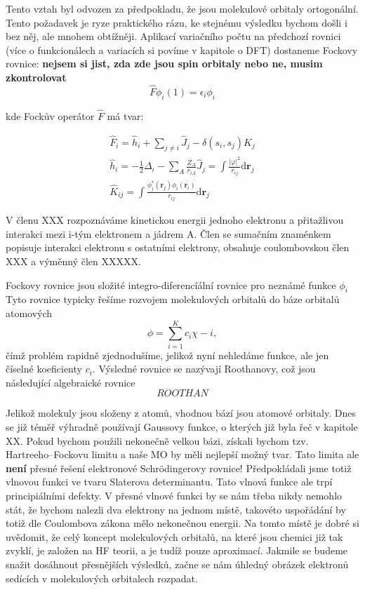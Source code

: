 Tento vztah byl odvozen za předpokladu, že jsou molekulové orbitaly ortogonální. Tento požadavek je ryze praktického rázu, ke stejnému výsledku bychom došli i bez něj, ale mnohem obtížněji. Aplikací variačního počtu na předchozí rovnici (více o funkcionálech a variacích si povíme v kapitole o DFT) dostaneme Fockovy rovnice: \textbf{nejsem si jist, zda zde jsou spin orbitaly nebo ne, musim zkontrolovat}
\begin{equation}
\hat{F}\phi_i(1) = \epsilon_i \phi_i   
\end{equation}

kde Fockův operátor $\hat{F}$ má tvar:

\begin{eqnarray}
\hat{F}_i = \hat{h}_i+\sum_{j\neq i} \hat{J}_j - \delta(s_i,s_j) \hat{K}_j \\
\hat{h}_i = -\frac{1}{2}\Delta_i - \sum_{A}\frac{Z_A}{r_{iA}}
\hat{J}_j=\int \frac{|\varphi |^2}{r_{ij}}\mathrm{d}\textbf{r}_j \\
\hat{K}_{ij} = \int \frac{\phi_j^*(\mathbf{r}_j)\phi_i(\mathbf{r}_i)}{r_{ij}}\mathrm{d}\textbf{r}_j
\end{eqnarray}

V členu XXX rozpoznáváme kinetickou energii jednoho elektronu a přitažlivou interakci mezi i-tým elektronem a jádrem A. Člen se sumačním znaménkem popisuje interakci elektronu s ostatními elektrony, obsahuje coulombovskou člen XXX a výměnný člen XXXXX.


Fockovy rovnice jsou složité integro-diferencíální rovnice pro neznámé funkce $\phi_i$
Tyto rovnice typicky řešíme rozvojem molekulových orbitalů do báze orbitalů atomových
\begin{equation}
\phi=\sum_{i=1}^K c_i \chi-i ,
\end{equation}
čímž problém rapidně zjednodušíme, jelikož nyní nehledáme funkce, ale jen číselné koeficienty $c_i$.
Výsledné rovnice se nazývají Roothanovy, což jsou následující algebraické rovnice
\begin{equation}
ROOTHAN
\end{equation}


Jelikož molekuly jsou složeny z atomů, vhodnou bází jsou atomové orbitaly.
Dnes se již téměř výhradně používají Gaussovy funkce, o kterých již byla řeč v kapitole XX.
Pokud bychom použili nekonečně velkou bázi, získali bychom tzv. Hartreeho--Fockovu limitu a naše MO by měli nejlepší možný tvar. Tato limita ale \textbf{není} přesné řešení elektronové Schr\"{o}dingerovy rovnice!
Předpokládali jsme totiž vlnovou funkci ve tvaru Slaterova determinantu. Tato vlnová funkce ale trpí principiálními defekty. V přesné vlnové funkci by se nám třeba nikdy nemohlo stát, že bychom nalezli dva elektrony na jednom místě, takovéto uspořádání by totiž dle Coulombova zákona mělo nekonečnou energii.
Na tomto místě je dobré si uvědomit, že celý koncept molekulových orbitalů, na které jsou chemici již tak zvyklí, je založen na HF teorii, a je tudíž pouze aproximací. Jakmile se budeme snažit dosáhnout přesnějších výsledků, začne se nám úhledný obrázek elektronů sedících v molekulových orbitalech rozpadat.

